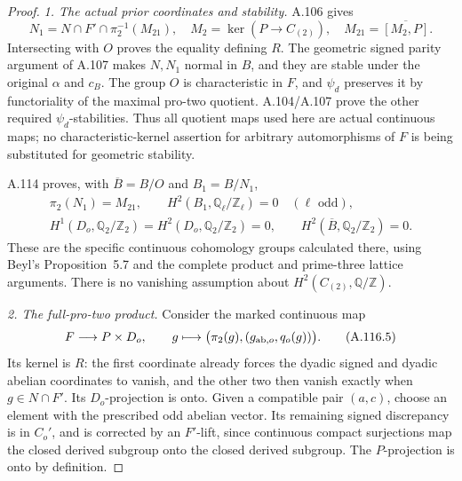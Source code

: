 \begin{proof}
\emph{1. The actual prior coordinates and stability.}
A.106 gives
\[
 N_1=N\cap F'\cap\pi_2^{-1}(M_{21}),\quad
 M_2=\ker(P\to C_{(2)}),\quad M_{21}=\overline{[M_2,P]}.
                                                                  \tag{A.116.3}
\]
Intersecting with \(O\) proves the equality defining \(R\).
The geometric signed parity argument of A.107 makes \(N,N_1\)
normal in \(B\), and they are stable under the original \(\alpha\)
and \(c_B\). The group \(O\) is characteristic in \(F\), and
\(\psi_d\) preserves it by functoriality of the maximal pro-two
quotient. A.104/A.107 prove the other required \(\psi_d\)-stabilities.
Thus all quotient maps used here are actual continuous maps; no
characteristic-kernel assertion for arbitrary automorphisms of \(F\)
is being substituted for geometric stability.

A.114 proves, with \(\overline B=B/O\) and \(B_1=B/N_1\),
\[
 \begin{gathered}
 \pi_2(N_1)=M_{21},\qquad
 H^2(B_1,\mathbb Q_\ell/\mathbb Z_\ell)=0\quad(\ell\text{ odd}),\\
 H^1(D_o,\mathbb Q_2/\mathbb Z_2)
 =H^2(D_o,\mathbb Q_2/\mathbb Z_2)=0,\qquad
 H^2(\overline B,\mathbb Q_2/\mathbb Z_2)=0.
 \end{gathered}                                                    \tag{A.116.4}
\]
These are the specific continuous cohomology groups calculated there,
using Beyl's Proposition~5.7 and the complete product and prime-three
lattice arguments. There is no vanishing assumption about
\(H^2(C_{(2)},\mathbb Q/\mathbb Z)\).

\medskip\noindent\emph{2. The full-pro-two product.}
Consider the marked continuous map
\[
 F\longrightarrow P\times D_o,\qquad
 g\longmapsto\bigl(\pi_2(g),(g_{{\rm ab},o},q_o(g))\bigr).
                                                                  \tag{A.116.5}
\]
Its kernel is \(R\): the first coordinate already forces the dyadic
signed and dyadic abelian coordinates to vanish, and the other two
then vanish exactly when \(g\in N\cap F'\).
Its \(D_o\)-projection is onto. Given a compatible pair \((a,c)\),
choose an element with the prescribed odd abelian vector. Its
remaining signed discrepancy is in \(C_o'\), and is corrected by an
\(F'\)-lift, since continuous compact surjections map the closed
derived subgroup onto the closed derived subgroup.
The \(P\)-projection is onto by definition.


\end{proof}
